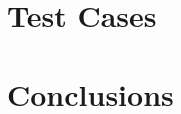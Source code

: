 \documentclass[12pt]{article}
\begin{document}
	\section{Test Cases}

	\section{Conclusions}
	
	\begin{thebibliography}{9}

	\end{thebibliography}
\end{document}
